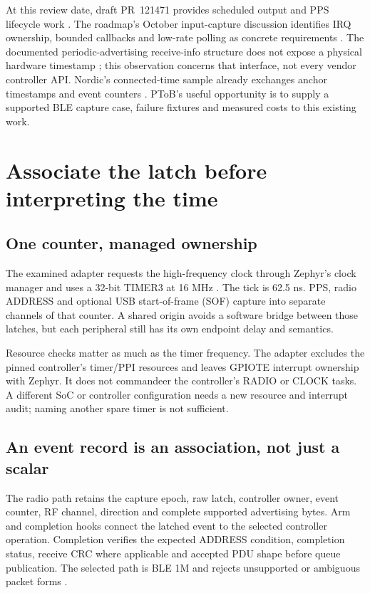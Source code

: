 \documentclass[10pt,letterpaper]{article}
\begin{document}
At this review date, draft PR~121471 provides scheduled output and PPS lifecycle work \cite{pps}. The roadmap's October input-capture discussion identifies IRQ ownership, bounded callbacks and low-rate polling as concrete requirements \cite{roadmap}. The documented periodic-advertising receive-info structure does not expose a physical hardware timestamp \cite{recv}; this observation concerns that interface, not every vendor controller API. Nordic's connected-time sample already exchanges anchor timestamps and event counters \cite{conn}. PToB's useful opportunity is to supply a supported BLE capture case, failure fixtures and measured costs to this existing work.

\newpage
\section{Associate the latch before interpreting the time}
\subsection{One counter, managed ownership}
The examined adapter requests the high-frequency clock through Zephyr's clock manager and uses a 32-bit TIMER3 at 16 MHz \cite{implementation}. The tick is 62.5 ns. PPS, radio ADDRESS and optional USB start-of-frame (SOF) capture into separate channels of that counter. A shared origin avoids a software bridge between those latches, but each peripheral still has its own endpoint delay and semantics.

Resource checks matter as much as the timer frequency. The adapter excludes the pinned controller's timer/PPI resources and leaves GPIOTE interrupt ownership with Zephyr. It does not commandeer the controller's RADIO or CLOCK tasks. A different SoC or controller configuration needs a new resource and interrupt audit; naming another spare timer is not sufficient.

\subsection{An event record is an association, not just a scalar}
The radio path retains the capture epoch, raw latch, controller owner, event counter, RF channel, direction and complete supported advertising bytes. Arm and completion hooks connect the latched event to the selected controller operation. Completion verifies the expected ADDRESS condition, completion status, receive CRC where applicable and accepted PDU shape before queue publication. The selected path is BLE 1M and rejects unsupported or ambiguous packet forms \cite{implementation}.
\end{document}
